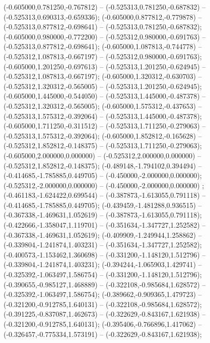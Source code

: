  (-0.605000,0.781250,-0.767812) -- (-0.525313,0.781250,-0.687832) -- (-0.525313,0.690313,-0.659336);
 (-0.605000,0.877812,-0.779878) -- (-0.525313,0.877812,-0.698641) -- (-0.525313,0.781250,-0.687832);
 (-0.605000,0.980000,-0.772200) -- (-0.525312,0.980000,-0.691763) -- (-0.525313,0.877812,-0.698641);
 (-0.605000,1.087813,-0.744778) -- (-0.525312,1.087813,-0.667197) -- (-0.525312,0.980000,-0.691763);
 (-0.605000,1.201250,-0.697613) -- (-0.525313,1.201250,-0.624945) -- (-0.525312,1.087813,-0.667197);
 (-0.605000,1.320312,-0.630703) -- (-0.525312,1.320312,-0.565005) -- (-0.525313,1.201250,-0.624945);
 (-0.605000,1.445000,-0.544050) -- (-0.525313,1.445000,-0.487378) -- (-0.525312,1.320312,-0.565005);
 (-0.605000,1.575312,-0.437653) -- (-0.525313,1.575312,-0.392064) -- (-0.525313,1.445000,-0.487378);
 (-0.605000,1.711250,-0.311512) -- (-0.525313,1.711250,-0.279063) -- (-0.525313,1.575312,-0.392064);
 (-0.605000,1.852812,-0.165628) -- (-0.525312,1.852812,-0.148375) -- (-0.525313,1.711250,-0.279063);
 (-0.605000,2.000000,0.000000) -- (-0.525312,2.000000,0.000000) -- (-0.525312,1.852812,-0.148375);
 (-0.489148,-1.794102,0.394494) -- (-0.414685,-1.785885,0.449705) -- (-0.450000,-2.000000,0.000000);
 (-0.525312,-2.000000,0.000000) -- (-0.450000,-2.000000,0.000000) ;
 (-0.461183,-1.624422,0.699544) -- (-0.387873,-1.613055,0.791118) -- (-0.414685,-1.785885,0.449705);
 (-0.439459,-1.481288,0.936515) -- (-0.367338,-1.469631,1.052619) -- (-0.387873,-1.613055,0.791118);
 (-0.422666,-1.358047,1.119701) -- (-0.351634,-1.347727,1.252582) -- (-0.367338,-1.469631,1.052619);
 (-0.409909,-1.249944,1.258862) -- (-0.339804,-1.241874,1.403231) -- (-0.351634,-1.347727,1.252582);
 (-0.400573,-1.153462,1.360698) -- (-0.331200,-1.148120,1.512796) -- (-0.339804,-1.241874,1.403231);
 (-0.394244,-1.065903,1.429741) -- (-0.325392,-1.063497,1.586754) -- (-0.331200,-1.148120,1.512796);
 (-0.390655,-0.985127,1.468889) -- (-0.322108,-0.985684,1.628572) -- (-0.325392,-1.063497,1.586754);
 (-0.389662,-0.909365,1.479723) -- (-0.321200,-0.912785,1.640131) -- (-0.322108,-0.985684,1.628572);
 (-0.391225,-0.837087,1.462673) -- (-0.322629,-0.843167,1.621938) -- (-0.321200,-0.912785,1.640131);
 (-0.395406,-0.766896,1.417062) -- (-0.326457,-0.775334,1.573191) -- (-0.322629,-0.843167,1.621938);
